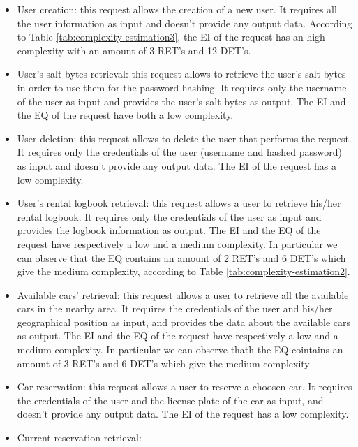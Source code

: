 \begin{itemize}
	\item User creation: this request allows the creation of a new user. It requires all the user information as input and doesn't provide any output data. According to Table \ref{tab:complexity-estimation3}, the EI of the request has an high complexity with an amount of 3 RET's and 12 DET's.
	\item User's salt bytes retrieval: this request allows to retrieve the user's salt bytes in order to use them for the password hashing. It requires only the username of the user as input and provides the user's salt bytes as output. The EI and the EQ of the request have both a low complexity.
	\item User deletion: this request allows to delete the user that performs the request. It requires only the credentials of the user (username and hashed password) as input and doesn't provide any output data. The EI of the request has a low complexity.
	\item User's rental logbook retrieval: this request allows a user to retrieve his/her rental logbook. It requires only the credentials of the user as input and provides the logbook information as output. The EI and the EQ of the request have respectively a low and a medium complexity. In particular we can observe that the EQ contains an amount of 2 RET's and 6 DET's which give the medium complexity, according to Table \ref{tab:complexity-estimation2}.
	\item Available cars' retrieval: this request allows a user to retrieve all the available cars in the nearby area. It requires the credentials of the user and his/her geographical position as input, and provides the data about the available cars as output. The EI and the EQ of the request have respectively a low and a medium complexity. In particular we can observe thath the EQ cointains an amount of 3 RET's and 6 DET's which give the medium complexity
	\item Car reservation: this request allows a user to reserve a choosen car. It requires the credentials of the user and the license plate of the car as input, and doesn't provide any output data. The EI of the request has a low complexity.
	\item Current reservation retrieval:
\end{itemize}

